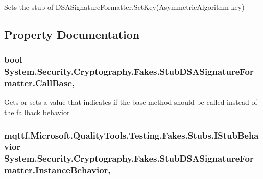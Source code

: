 Sets the stub of D\-S\-A\-Signature\-Formatter.\-Set\-Key(\-Asymmetric\-Algorithm key)



\subsection{Property Documentation}
\hypertarget{class_system_1_1_security_1_1_cryptography_1_1_fakes_1_1_stub_d_s_a_signature_formatter_a949eefd33ad74b4c4c0eaaf3330b27c8}{
\subsubsection[{Call\-Base}]{\setlength{\rightskip}{0pt plus 5cm}bool System.\-Security.\-Cryptography.\-Fakes.\-Stub\-D\-S\-A\-Signature\-Formatter.\-Call\-Base\hspace{0.3cm}{\ttfamily [get]}, {\ttfamily [set]}}}\label{class_system_1_1_security_1_1_cryptography_1_1_fakes_1_1_stub_d_s_a_signature_formatter_a949eefd33ad74b4c4c0eaaf3330b27c8}


Gets or sets a value that indicates if the base method should be called instead of the fallback behavior

\hypertarget{class_system_1_1_security_1_1_cryptography_1_1_fakes_1_1_stub_d_s_a_signature_formatter_a5e3b2f47a85d7c34eb640652b68db945}{
\subsubsection[{Instance\-Behavior}]{\setlength{\rightskip}{0pt plus 5cm}mqttf.\-Microsoft.\-Quality\-Tools.\-Testing.\-Fakes.\-Stubs.\-I\-Stub\-Behavior System.\-Security.\-Cryptography.\-Fakes.\-Stub\-D\-S\-A\-Signature\-Formatter.\-Instance\-Behavior\hspace{0.3cm}{\ttfamily [get]}, {\ttfamily [set]}}}\label{class_system_1_1_security_1_1_cryptography_1_1_fakes_1_1_stub_d_s_a_signature_formatter_a5e3b2f47a85d7c34eb640652b68db945}


